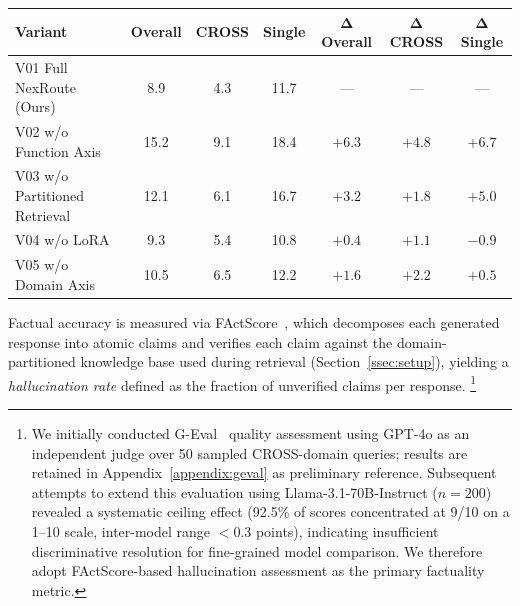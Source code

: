 \documentclass[a4paper,fleql]{cas-sc}
\begin{document}
\vspace{6pt plus 4pt minus 3pt}
\begin{center}
\begingroup
{}
\label{tab:ablation}
\begin{tabular}{lcccccc}
\toprule
\textbf{Variant} & \textbf{Overall} & \textbf{CROSS} & \textbf{Single} & $\boldsymbol{\Delta}$\textbf{Overall} & $\boldsymbol{\Delta}$\textbf{CROSS} & $\boldsymbol{\Delta}$\textbf{Single} \\
\midrule
V01 Full NexRoute (Ours) & 8.9 & 4.3 & 11.7 & --- & --- & --- \\
V02 w/o Function Axis    & 15.2 & 9.1 & 18.4 & $+6.3$ & $+4.8$ & $+6.7$ \\
V03 w/o Partitioned Retrieval & 12.1 & 6.1 & 16.7 & $+3.2$ & $+1.8$ & $+5.0$ \\
V04 w/o LoRA        &  9.3 & 5.4 & 10.8 & $+0.4$ & $+1.1$ & $-0.9$ \\
V05 w/o Domain Axis & 10.5 & 6.5 & 12.2 & $+1.6$ & $+2.2$ & $+0.5$ \\
\midrule
\end{tabular}
\endgroup
\end{center}
\vspace{6pt plus 4pt minus 3pt}

Factual accuracy is measured via FActScore~\citep{min2023factscore}, which
decomposes each generated response into atomic claims and verifies each claim
against the domain-partitioned knowledge base used during retrieval
(Section~\ref{ssec:setup}), yielding a \emph{hallucination rate} defined
as the fraction of unverified claims per response.%
\footnote{%
  We initially conducted G-Eval~\citep{liu2023geval} quality assessment using
  GPT-4o as an independent judge over 50 sampled CROSS-domain queries; results
  are retained in Appendix~\ref{appendix:geval} as preliminary reference.
  Subsequent attempts to extend this evaluation using
  Llama-3.1-70B-Instruct ($n{=}200$) revealed a systematic ceiling effect
  (92.5\% of scores concentrated at 9/10 on a 1--10 scale,
  inter-model range $<$0.3 points), indicating insufficient discriminative
  resolution for fine-grained model comparison.
  We therefore adopt FActScore-based hallucination assessment as the primary
  factuality metric.
}
\end{document}
